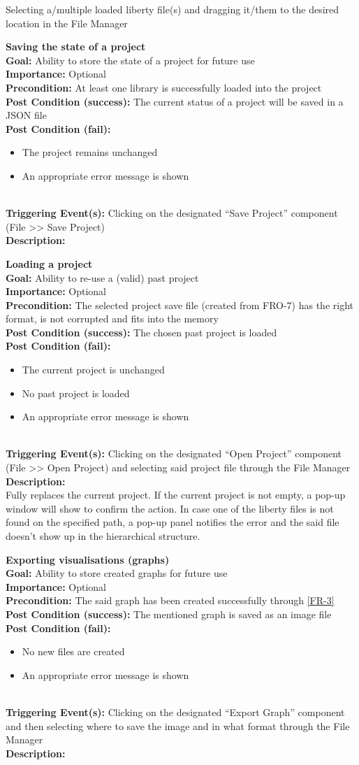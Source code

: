 \documentclass[10pt,a4paper]{report}
\newcommand{\FRODescription}[8]{
    \textbf{#1} \leavevmode \\
    \textbf{Goal: } #2 \leavevmode \\
    \textbf{Importance: } #3 \leavevmode \\
    \textbf{Precondition: } #4 \leavevmode \\
    \textbf{Post Condition (success): } #5 \leavevmode \\
    \textbf{Post Condition (fail): } #6 \leavevmode \\
    \textbf{Triggering Event(s): } #7 \leavevmode \\
    \textbf{Description: } \leavevmode \\
    #8}
\begin{document}
\begin{FRO}
{\begin{itemize}
    \end{itemize}}
    {Selecting a/multiple loaded liberty file(s) and dragging it/them to the desired location in the File Manager}
    \item \FRODescription{Saving the state of a project}
    {Ability to store the state of a project for future use}
    {Optional}
    {At least one library is successfully loaded into the project}
    {The current status of a project will be saved in a JSON file}
    {\begin{itemize}
        \item The project remains unchanged
        \item An appropriate error message is shown
    \end{itemize}}
    {Clicking on the designated “Save Project” component (File >> Save Project)}
    \item \FRODescription{Loading a project}
    {Ability to re-use a (valid) past project}
    {Optional}
    {The selected project save file (created from FRO-7) has the right format, is not corrupted and fits into the memory}
    {The chosen past project is loaded}
    {\begin{itemize}
        \item The current project is unchanged
        \item No past project is loaded
        \item An appropriate error message is shown
    \end{itemize}}
    {Clicking on the designated “Open Project” component (File >> Open Project) and selecting said project file through the File Manager}
    {Fully replaces the current project. If the current project is not empty, a pop-up window will show to confirm the action. In case one of the liberty files is not found on the specified path, a pop-up panel notifies the error and the said file doesn’t show up in the hierarchical structure.}
    \item \FRODescription{Exporting visualisations (graphs)}
    {Ability to store created graphs for future use}
    {Optional}
    {The said graph has been created successfully through \ref{FR-3}}
    {The mentioned graph is saved as an image file}
    {\begin{itemize}
        \item No new files are created
        \item An appropriate error message is shown
    \end{itemize}}
    {Clicking on the designated “Export Graph” component and then selecting where to save the image and in what format through the File Manager}

\end{FRO}
\end{document}
